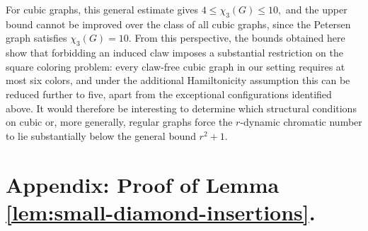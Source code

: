 \documentclass[10pt,a4paper]{article}
\newtheorem{lemma}     	[theorem] {Lemma}
\theoremstyle{case}
\numberwithin{subcase}{case}
\begin{document}
For cubic graphs, this general estimate gives
$
4\leq \chi_3(G)\leq 10,
$
and the upper bound cannot be improved over the class of all cubic graphs, since the Petersen graph satisfies \(\chi_3(G)=10\). From this perspective, the bounds obtained here show that forbidding an induced claw imposes a substantial restriction on the square coloring problem: every claw-free cubic graph in our setting requires at most six colors, and under the additional Hamiltonicity assumption this can be reduced further to five, apart from the exceptional configurations identified above.
It would therefore be interesting to determine which structural conditions on cubic or, more generally, regular graphs force the \(r\)-dynamic chromatic number to lie substantially below the general bound \(r^2+1\). 
\newpage
\section{Appendix: Proof of Lemma \ref{lem:small-diamond-insertions}.}


\end{document}
